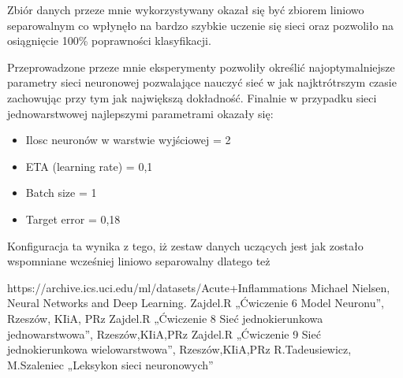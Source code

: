 \documentclass[12pt,twoside]{article}
\begin{document}
Zbiór danych przeze mnie wykorzystywany okazał się być zbiorem liniowo separowalnym co wpłynęło na bardzo szybkie uczenie się sieci oraz pozwoliło na osiągnięcie 100\% poprawności klasyfikacji.

Przeprowadzone przeze mnie eksperymenty pozwoliły określić najoptymalniejsze parametry sieci neuronowej pozwalające nauczyć sieć w jak najktrótrszym czasie zachowując przy tym jak największą dokładność. Finalnie w przypadku sieci jednowarstwowej najlepszymi parametrami okazały się:
\begin{itemize}
	\item Ilosc neuronów w warstwie wyjściowej = 2
	\item ETA (learning rate) = 0,1
	\item Batch size = 1
	\item Target error = 0,18
\end{itemize}
Konfiguracja ta wynika z tego, iż zestaw danych uczących jest jak zostało wspomniane wcześniej liniowo separowalny dlatego też 
\clearpage


\begin{thebibliography}{4}
 https://archive.ics.uci.edu/ml/datasets/Acute+Inflammations
 Michael Nielsen, Neural Networks and Deep Learning.
 Zajdel.R „Ćwiczenie 6 Model Neuronu”, Rzeszów, KIiA, PRz
 Zajdel.R „Ćwiczenie 8 Sieć jednokierunkowa jednowarstwowa”, Rzeszów,KIiA,PRz
 Zajdel.R „Ćwiczenie 9 Sieć jednokierunkowa wielowarstwowa”, Rzeszów,KIiA,PRz
 R.Tadeusiewicz, M.Szaleniec „Leksykon sieci neuronowych”
\end{thebibliography}

\clearpage
\end{document}
